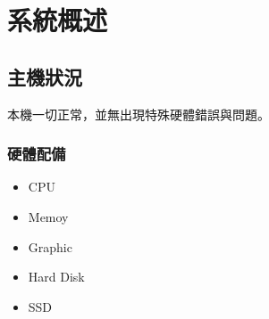 \chapter{系統概述} %
\label{chapter1} %
\ifpdf
    \graphicspath{{Figures/chapter1/PNG/}{Figures/chapter1/PDF/}{Figures/chapter1/}}
\else
    \graphicspath{{Figures/chapter1/EPS/}{Figures/chapter1/}}
\fi


\section{主機狀況}\label{1_sec:define}
本機一切正常，並無出現特殊硬體錯誤與問題。

\subsection{硬體配備}\label{1_subsec:WCSGC}

\begin{itemize}
    \item CPU
    \item Memoy
    \item Graphic
    \item Hard Disk
    \item SSD
\end{itemize}

